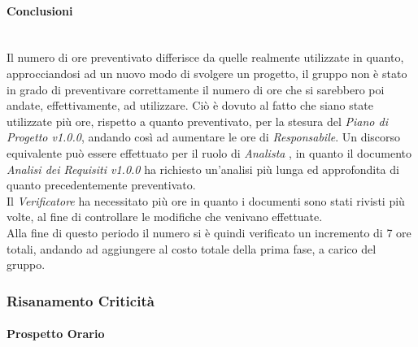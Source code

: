\paragraph{Conclusioni} \-\\
Il numero di ore preventivato differisce da quelle realmente utilizzate in quanto, approcciandosi ad un nuovo modo di svolgere un progetto, il gruppo non è stato in grado di preventivare correttamente il numero di ore che si sarebbero poi andate, effettivamente, ad utilizzare. Ciò è dovuto al fatto che siano state utilizzate più ore, rispetto a quanto preventivato, per la stesura del \textit{Piano di Progetto v1.0.0}, andando così ad aumentare le ore di \textit{Responsabile}. Un discorso equivalente può essere effettuato per il ruolo di \textit{Analista} , in quanto il documento \textit{Analisi dei Requisiti v1.0.0} ha richiesto un'analisi più lunga ed approfondita di quanto precedentemente preventivato. \\
Il \textit{Verificatore} ha necessitato più ore in quanto i documenti sono stati rivisti più volte, al fine di controllare le modifiche che venivano effettuate. \\
Alla fine di questo periodo il numero si è quindi verificato un incremento di 7 ore totali, andando ad aggiungere  al costo totale della prima fase, a carico del gruppo. 

\subsubsection{Risanamento Criticità}
\label{RA1}

\paragraph{Prospetto Orario} \-\\

